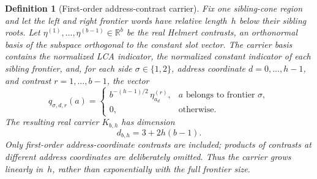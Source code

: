\documentclass[11pt]{article}
\newtheorem{definition}{Definition}[section]
\theoremstyle{remark}
\newcommand{\R}{\mathbb{R}}
\numberwithin{equation}{section}
\begin{document}
\begin{definition}[First-order address-contrast carrier]\label{def:first-order-address-carrier}
Fix one sibling-cone region and let the left and right frontier words have relative length~\(h\) below their sibling roots.  Let
\(\eta^{(1)},\ldots,\eta^{(b-1)}\in\R^b\)
be the real Helmert contrasts, an orthonormal basis of the subspace orthogonal to the constant slot vector.  The carrier basis contains the normalized LCA indicator, the normalized constant indicator of each sibling frontier, and, for each side \(\sigma\in\{1,2\}\), address coordinate \(d=0,\ldots,h-1\), and contrast \(r=1,\ldots,b-1\), the vector
\begin{equation}
 q_{\sigma,d,r}(a)
 =
 \begin{cases}
 b^{-(h-1)/2}\,\eta^{(r)}_{a_d},
   & a\text{ belongs to frontier }\sigma,\\
 0,&\text{otherwise}.
 \end{cases}
 \label{eq:first-order-address-contrast}
\end{equation}
The resulting real carrier \(K_{b,h}\) has dimension
\begin{equation}
 d_{b,h}=3+2h(b-1).
 \label{eq:nested-role-dimension}
\end{equation}
Only first-order address-coordinate contrasts are included; products of contrasts at different address coordinates are deliberately omitted.  Thus the carrier grows linearly in~\(h\), rather than exponentially with the full frontier size.
\end{definition}
\end{document}
